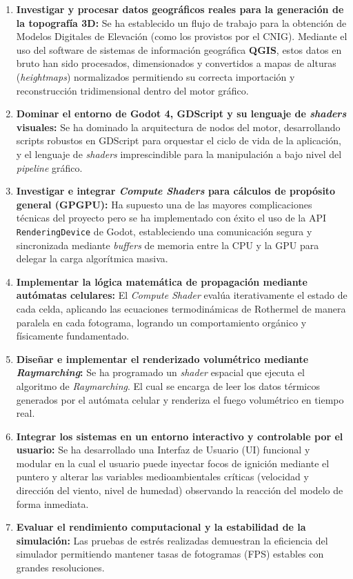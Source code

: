 \begin{enumerate}
    \item \textbf{Investigar y procesar datos geográficos reales para la generación de la topografía 3D:} Se ha establecido un flujo de trabajo para la obtención de Modelos Digitales de Elevación (como los provistos por el CNIG). Mediante el uso del software de sistemas de información geográfica \textbf{QGIS}, estos datos en bruto han sido procesados, dimensionados y convertidos a mapas de alturas (\textit{heightmaps}) normalizados permitiendo su correcta importación y reconstrucción tridimensional dentro del motor gráfico. 
   
    \item \textbf{Dominar el entorno de Godot 4, GDScript y su lenguaje de \textit{shaders} visuales:} Se ha dominado la arquitectura de nodos del motor, desarrollando scripts robustos en GDScript para orquestar el ciclo de vida de la aplicación, y el lenguaje de  \textit{shaders} imprescindible para la manipulación a bajo nivel del \textit{pipeline} gráfico.

    \item \textbf{Investigar e integrar \textit{Compute Shaders} para cálculos de propósito general (GPGPU):} Ha supuesto una de las mayores complicaciones técnicas del proyecto pero se ha implementado con éxito el uso de la API \texttt{RenderingDevice} de Godot, estableciendo una comunicación segura y sincronizada mediante \textit{buffers} de memoria entre la CPU y la GPU para delegar la carga algorítmica masiva.
    
    \item \textbf{Implementar la lógica matemática de propagación mediante autómatas celulares:} El \textit{Compute Shader} evalúa iterativamente el estado de cada celda, aplicando las ecuaciones termodinámicas de Rothermel de manera paralela en cada fotograma, logrando un comportamiento orgánico y físicamente fundamentado.
    
    \item \textbf{Diseñar e implementar el renderizado volumétrico mediante \textit{Raymarching}:} Se ha programado un \textit{shader} espacial que ejecuta el algoritmo de \textit{Raymarching}. El cual se encarga de leer los datos térmicos generados por el autómata celular y renderiza el fuego volumétrico en tiempo real.
    
    \item \textbf{Integrar los sistemas en un entorno interactivo y controlable por el usuario:} Se ha desarrollado una Interfaz de Usuario (UI) funcional y modular en la cual el usuario puede inyectar focos de ignición mediante el puntero y alterar las variables medioambientales críticas (velocidad y dirección del viento, nivel de humedad) observando la reacción del modelo de forma inmediata.
    
    \item \textbf{Evaluar el rendimiento computacional y la estabilidad de la simulación:} Las pruebas de estrés realizadas demuestran la eficiencia del simulador permitiendo mantener tasas de fotogramas (FPS) estables con grandes resoluciones.

\end{enumerate}

